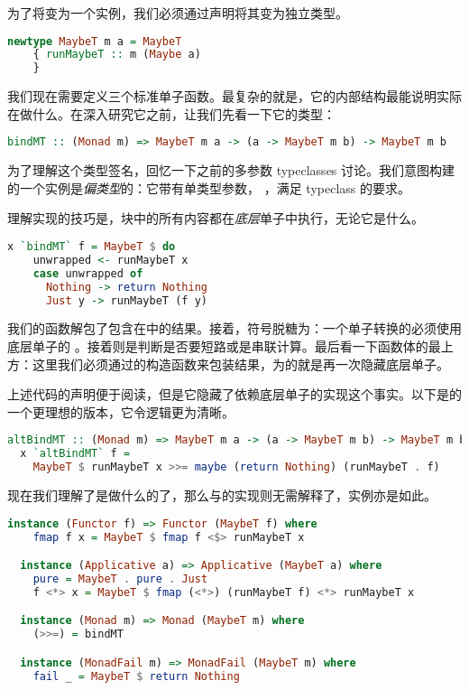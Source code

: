 \documentclass[./main.tex]{subfiles}
\begin{document}
为了将变为一个实例，我们必须通过声明将其变为独立类型。

\begin{lstlisting}[language=Haskell]
  newtype MaybeT m a = MaybeT
    { runMaybeT :: m (Maybe a)
    }
\end{lstlisting}

我们现在需要定义三个标准单子函数。最复杂的就是\acode{(>>=)}，它的内部结构最能说明实际在做什么。在深入研究它之前，让我们先看一下它的类型：

\begin{lstlisting}[language=Haskell]
  bindMT :: (Monad m) => MaybeT m a -> (a -> MaybeT m b) -> MaybeT m b
\end{lstlisting}

为了理解这个类型签名，回忆一下之前的多参数 typeclasses 讨论。我们意图构建的一个实例是\textit{偏类型}的：它带有单类型参数，
，满足 typeclass 的要求。

理解\acode{(>>=)}实现的技巧是，块中的所有内容都在\textit{底层}单子中执行，无论它是什么。

\begin{lstlisting}[language=Haskell]
  x `bindMT` f = MaybeT $ do
    unwrapped <- runMaybeT x
    case unwrapped of
      Nothing -> return Nothing
      Just y -> runMaybeT (f y)
\end{lstlisting}

我们的函数解包了包含在中的结果。接着，\acode{<-}符号脱糖为\acode{(>>=)}：一个单子转换的\acode{(>>=)}必须使用底层单子的
\acode{(>>=)}。接着则是判断是否要短路或是串联计算。最后看一下函数体的最上方：这里我们必须通过的构造函数来包装结果，为的就是再一次隐藏底层单子。

上述代码的声明便于阅读，但是它隐藏了依赖底层单子的\acode{(>>=)}实现这个事实。以下是的一个更理想的\acode{(>>=)}版本，它令逻辑更为清晰。

\begin{lstlisting}[language=Haskell]
  altBindMT :: (Monad m) => MaybeT m a -> (a -> MaybeT m b) -> MaybeT m b
  x `altBindMT` f =
    MaybeT $ runMaybeT x >>= maybe (return Nothing) (runMaybeT . f)
\end{lstlisting}

现在我们理解了\acode{(>>=)}是做什么的了，那么与的实现则无需解释了，实例亦是如此。

\begin{lstlisting}[language=Haskell]
  instance (Functor f) => Functor (MaybeT f) where
    fmap f x = MaybeT $ fmap f <$> runMaybeT x

  instance (Applicative a) => Applicative (MaybeT a) where
    pure = MaybeT . pure . Just
    f <*> x = MaybeT $ fmap (<*>) (runMaybeT f) <*> runMaybeT x

  instance (Monad m) => Monad (MaybeT m) where
    (>>=) = bindMT

  instance (MonadFail m) => MonadFail (MaybeT m) where
    fail _ = MaybeT $ return Nothing
\end{lstlisting}
\end{document}
